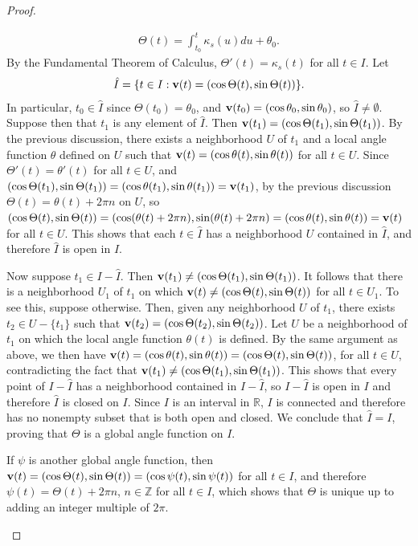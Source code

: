 \documentclass[12pt,letterpaper,reqno]{article}
\numberwithin{equation}{section}
\newcommand{\R}{\ensuremath{\mathbb R}}
\newcommand{\Z}{\ensuremath{\mathbb Z}}
\newcommand{\bv}{{\bf v}}
\newcommand{\fixme}[1]{{\color{orange}{[#1]}}}
\begin{document}
{\begin{proof}
\begin{enumerate}
\begin{align*}
	\Theta(t)=\int_{t_0}^t\kappa_s(u)du+\theta_0.
\end{align*}
By the Fundamental Theorem of Calculus, $\Theta'(t)=\kappa_s(t)$ for all $t \in I$. Let 
\begin{align*}
	\hat{I}=\{t \in I: \bv(t)=(\cos \Theta(t),\sin \Theta(t))\}.
\end{align*}
In particular, $t_0 \in \hat{I}$ since $\Theta(t_0)=\theta_0$, and $\bv(t_0)=(\cos \theta_0,\sin\theta_0)$, so $\hat{I} \neq \emptyset$. Suppose then that $t_1$ is any element of $\hat{I}$. Then $\bv(t_1)=(\cos \Theta(t_1),\sin\Theta(t_1))$. By the previous discussion, there exists a neighborhood $U$ of $t_1$ and a local angle function $\theta$ defined on $U$ such that $\bv(t)=(\cos \theta(t),\sin\theta(t))$ for all $t \in U$. Since $\Theta'(t)=\theta'(t)$ for all $t \in U$, and $(\cos \Theta(t_1),\sin \Theta(t_1))=(\cos \theta(t_1),\sin \theta(t_1))=\bv(t_1)$, by the previous discussion $\Theta(t)=\theta(t)+2\pi n$ on $U$, so $(\cos \Theta(t),\sin\Theta(t))=(\cos(\theta(t)+2\pi n),\sin(\theta(t)+2\pi n)=(\cos \theta(t),\sin\theta(t))=\bv(t)$ for all $t \in U$. This shows that each $t \in \hat{I}$ has a neighborhood $U$ contained in $\hat{I}$, and therefore $\hat{I}$ is open in $I$. 

Now suppose $t_1 \in I-\hat{I}$. Then $\bv(t_1) \neq (\cos \Theta(t_1),\sin \Theta(t_1))$. It follows that there is a neighborhood $U_1$ of $t_1$ on which $\bv(t) \neq (\cos \Theta(t),\sin \Theta(t))$ for all $t \in U_1$. To see this, suppose otherwise. Then, given any neighborhood $U$ of $t_1$, there exists $t_2 \in U-\{t_1\}$ such that $\bv(t_2)=(\cos \Theta(t_2),\sin \Theta(t_2))$. Let $U$ be a neighborhood of $t_1$ on which the local angle function $\theta(t)$ is defined. By the same argument as above, we then have $\bv(t)=(\cos \theta(t),\sin \theta(t))=(\cos \Theta(t),\sin \Theta(t))$,  for all $t \in U$, contradicting the fact that $\bv(t_1) \neq (\cos \Theta(t_1),\sin \Theta(t_1))$. This shows that every point of $I-\hat{I}$ has a neighborhood contained in $I-\hat{I}$, so $I-\hat{I}$ is open in $I$ and therefore $\hat{I}$ is closed on $I$. Since $I$ is an interval in $\R$, $I$ is connected and therefore has no nonempty subset that is both open and closed. We conclude that $\hat{I}=I$, proving that $\Theta$ is a global angle function on $I$. \fixme{Need an appendix on basic topological ideas used in the text.}

If $\psi$ is another global angle function, then $\bv(t)=(\cos \Theta(t),\sin \Theta(t))=(\cos \psi(t), \sin \psi(t))$ for all $t \in I$, and therefore $\psi(t)=\Theta(t)+2\pi n$, $n \in \Z$ for all $t \in I$, which shows that $\Theta$ is unique up to adding an integer multiple of $2\pi$.
\end{enumerate}
\end{proof}

}
\end{document}
